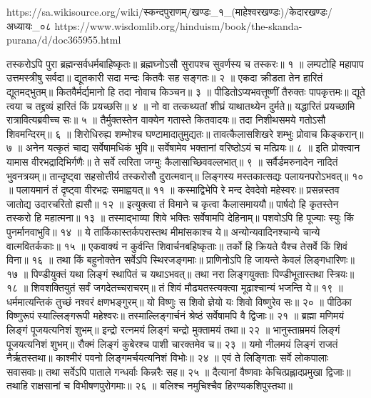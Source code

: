 https://sa.wikisource.org/wiki/स्कन्दपुराणम्/खण्डः_१_(माहेश्वरखण्डः)/केदारखण्डः/अध्यायः_०८
https://www.wisdomlib.org/hinduism/book/the-skanda-purana/d/doc365955.html


तस्करोऽपि पुरा ब्रह्मन्सर्वधर्मबाहिष्कृतः॥
ब्रह्मघ्नोऽसौ सुरापश्च सुवर्णस्य च तस्करः॥ १ ॥
लम्पटोहि महापाप उत्तमस्त्रीषु सर्वदा॥
द्यूतकारी सदा मन्दः कितवैः सह सङ्गतः॥ २ ॥
एकदा क्रीडता तेन हारितं द्यूतमद्भुतम्॥
कितवैर्मर्द्यमानो हि तदा नोवाच किञ्चन॥ ३ ॥
पीडितोऽप्यभवत्तूष्णीं तैरुक्तः पापकृत्तमः॥
द्यूते त्वया च तद्द्रव्यं हारितं किं प्रयच्छसि॥ ४ ॥
नो वा तत्कथ्यतां शीघ्रं याथातथ्येन दुर्मते॥
यद्धारितं प्रयच्छामि रात्रावित्यब्रवीच्च सः॥ ५ ॥
तैर्मुक्तस्तेन वाक्येन गतास्ते कितवादयः॥
तदा निशीथसमये गतोऽसौ शिवमन्दिरम्॥ ६ ॥
शिरोधिरुह्य शम्भोश्च घण्टामादातुमुद्यतः॥
तावत्कैलासशिखरे शम्भुः प्रोवाच किङ्करान्॥ ७ ॥
अनेन यत्कृतं चाद्य सर्वेषामधिकं भुवि॥
सर्वेषामेव भक्तानां वरिष्ठोऽयं च मत्प्रियः॥ ८ ॥
इति प्रोक्त्वान यामास वीरभद्रादिभिर्गणैः॥
ते सर्वे त्वरिता जग्मुः कैलासाच्छिववल्लभात्॥ ९ ॥
सर्वैर्डमरुनादेन नादितं भुवनत्रयम्॥
तान्दृष्ट्वा सहसोत्तीर्य तस्करोसौ दुरात्मवान्॥
लिङ्गस्य मस्तकात्सद्यः पलायनपरोऽभवत्॥ १० ॥
पलायमानं तं दृष्ट्वा वीरभद्रः समाह्वयत्॥ ११ ॥
कस्माद्विभेपि रे मन्द देवदेवो महेस्वरः॥
प्रसन्नस्तव जातोद्य उदारचरितो ह्यसौ॥ १२ ॥
इत्युक्त्वा तं विमाने च कृत्वा कैलासमाययौ॥
पार्षदो हि कृतस्तेन तस्करो हि महात्मना॥ १३ ॥
तस्माद्भाव्या शिवे भक्तिः सर्वेषामपि देहिनाम्॥
पशवोऽपि हि पूज्याः स्युः किं पुनर्मानवाभुवि॥ १४ ॥
ये तार्किकास्तर्कपरास्तथ मीमांसकाश्च ये॥
अन्योन्यवादिनश्चान्ये चान्ये वात्मवितर्ककाः॥ १५ ॥
एकवाक्यं न कुर्वन्ति शिवार्चनबहिष्कृताः॥
तर्को हि क्रियते यैश्च तेसर्वे किं शिवं विना॥ १६ ॥
तथा किं बहुनोक्तेन सर्वेऽपि स्थिरजङ्गमाः॥
प्राणिनोऽपि हि जायन्ते केवलं लिङ्गधारिणः॥ १७ ॥
पिण्डीयुक्तं यथा लिङ्गं स्थापितं च यथाऽभवत्॥
तथा नरा लिङ्गयुक्ताः पिण्डीभूतास्तथा स्त्रियः॥ १८ ॥
शिवशक्तियुतं सर्वं जगदेतच्चराचरम्॥
तं शिवं मौढ्यतस्त्यक्त्वा मूढाश्चान्यं भजन्ति ये॥ १९ ॥
धर्ममात्यन्तिकं तुच्छं नश्वरं क्षणभङ्गुरम्॥
यो विष्णुः स शिवो ज्ञेयो यः शिवो विष्णुरेव सः॥ २० ॥
पीठिका विष्णुरूपं स्याल्लिङ्गरूपी महेश्वरः॥
तस्माल्लिङ्गार्चनं श्रेष्ठं सर्वेषामपि वै द्विजाः॥ २१ ॥
ब्रह्मा मणिमयं लिङ्गं पूजयत्यनिशं शुभम्॥
इन्द्रो रत्नमयं लिङ्गं चन्द्रो मुक्तामयं तथा॥ २२ ॥
भानुस्ताम्रमयं लिङ्गं पूजयत्यनिशं शुभम्॥
रौक्मं लिङ्गं कुबेरश्च पाशी चारक्तमेव च॥ २३ ॥
यमो नीलमयं लिङ्गं राजतं नैर्ऋतस्तथा॥
काश्मीरं पवनो लिङ्गमर्चयत्यनिशं विभोः॥ २४ ॥
एवं ते लिङ्गिताः सर्वे लोकपालाः सवासवाः॥
तथा सर्वेऽपि पाताले गन्धर्वाः किन्नरैः सह॥ २५ ॥
दैत्यानां वैष्णवाः केचित्प्रह्लादप्रमुखा द्विजाः॥
तथाहि राक्षसानां च विभीषणपुरोगमाः॥ २६ ॥
बलिश्च नमुचिश्चैव हिरण्यकशिपुस्तथा॥
